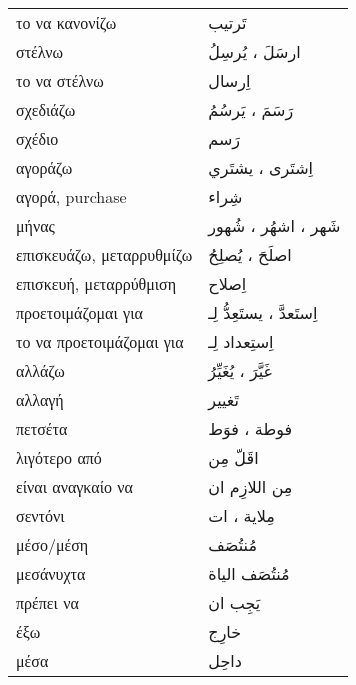 \documentclass[twocolumn,a4paper]{article}
\newcommand{\ar}[1]{\textarabic{#1}}
\newcommand{\pl}{\raisebox{0.15ex}{\footnotesize ◍}}
\newcommand{\normpl}[1]{\ar{ #1، ات }}
\newcommand{\vrf}{\raisebox{0.15ex}{\footnotesize ◉}}
\newcommand{\mas}{\raisebox{0.15ex}{\footnotesize ◫}}
\begin{document}
\begin{mpsupertabular}{ P{0.5\textwidth} P{0.5\textwidth} }
το να κανονίζω \mas          & \ar{ تَرتيب } \\
στέλνω \vrf                  & \ar{ ارسَلَ ، يُرسِلُ } \\ %
το να στέλνω \mas            & \ar{ اِرسال } \\
σχεδιάζω \vrf                & \ar{ رَسَمَ ، يَرسُمُ } \\  %
σχέδιο \mas                  & \ar{ رَسم } \\
αγοράζω \vrf                 & \ar{ اِشتَرى ، يشتَري } \\ %
αγορά, purchase \mas         & \ar{ شِراء } \\
μήνας \pl                    & \ar{ شَهر ، اشهُر ، شُهور } \\
επισκευάζω, μεταρρυθμίζω \vrf & \ar{ اصلَحَ ، يُصلِحُ } \\ %
επισκευή, μεταρρύθμιση \mas  & \ar{ اِصلاح } \\
προετοιμάζομαι για \vrf      & \ar{ اِستَعدَّ ، يستَعِدُّ لِـ } \\ %
το να προετοιμάζομαι για \mas & \ar{ اِستِعداد لِـ } \\
αλλάζω \vrf                  & \ar{ غَيَّرَ ، يُغَيِّرُ } \\ %
αλλαγή \mas                  & \ar{ تَغيير } \\
πετσέτα \pl                  & \ar{ فوطة ، فوَط } \\
λιγότερο από                 & \ar{ اقَلّ مِن } \\
είναι αναγκαίο να            & \ar{ مِن اللازِم ان } \\
σεντόνι \pl                  & \normpl{ مِلاية } \\
μέσο/μέση                    & \ar{ مُنتُصَف } \\
μεσάνυχτα                    & \ar{ مُنتُصَف الياة } \\
πρέπει να                    & \ar{ يَجِب ان } \\
έξω                          & \ar{ خارِج } \\
μέσα                         & \ar{ داحِل } \\


\end{mpsupertabular}

\end{document}
